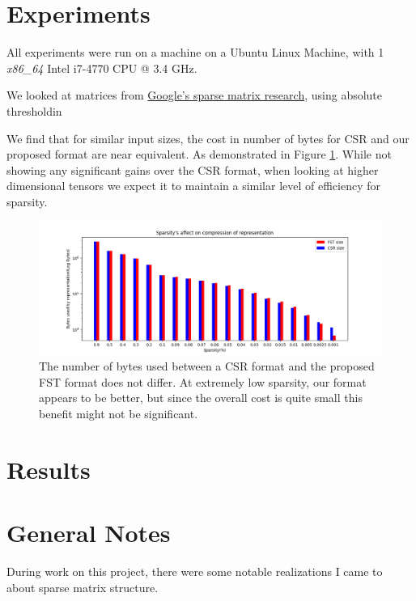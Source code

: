 \documentclass[12pt]{article}
\begin{document}

\section*{Experiments}

All experiments were run on a machine on a Ubuntu Linux Machine, with 1 \textit{x86\_64} Intel
i7-4770 CPU @ 3.4 GHz.

We looked at matrices from
\href{https://github.com/google-research/google-research/tree/master/state_of_sparsity}{Google's
sparse matrix research}, using absolute thresholdin

We find that for similar input sizes, the cost in number of bytes for CSR and our proposed
format are near equivalent. As demonstrated in Figure \ref{fig:sparsity}. While not showing any
significant gains over the CSR format, when looking at higher dimensional tensors we expect it
to maintain a similar level of efficiency for sparsity.

\begin{center}
\begin{figure}
  \includegraphics[width=\textwidth]{sparsity}
  \caption{The number of bytes used between a CSR format and the proposed FST format does not
differ. At extremely low sparsity, our format appears to be better, but since the overall
cost is quite small this benefit might not be significant.}
  \label{fig:sparsity}
\end{figure}
\end{center}



\section*{Results}

\appendix
\section{General Notes}
During work on this project, there were some notable realizations I came to about sparse matrix
structure.
\end{document}
